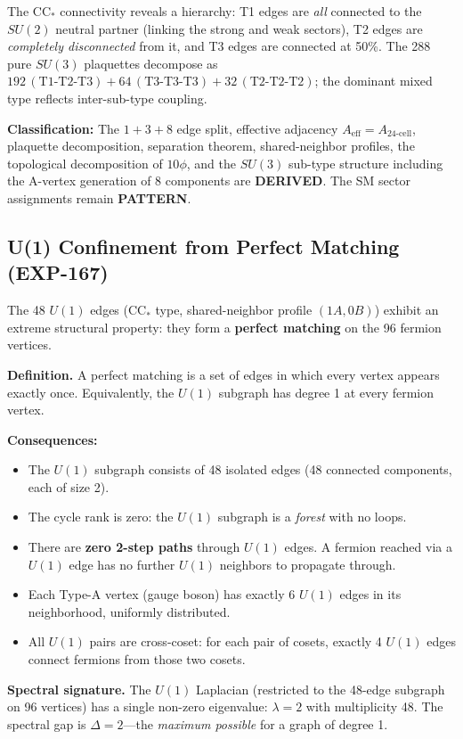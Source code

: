 \documentclass[12pt,a4paper]{article}
\begin{document}
The CC$_*$ connectivity reveals a hierarchy: T1 edges are \emph{all} connected to the $SU(2)$ neutral partner (linking the strong and weak sectors), T2 edges are \emph{completely disconnected} from it, and T3 edges are connected at 50\%. The 288 pure $SU(3)$ plaquettes decompose as $192\,(\text{T1-T2-T3}) + 64\,(\text{T3-T3-T3}) + 32\,(\text{T2-T2-T2})$; the dominant mixed type reflects inter-sub-type coupling.

\textbf{Classification:} The $1 + 3 + 8$ edge split, effective adjacency $A_{\text{eff}} = A_{\text{24-cell}}$, plaquette decomposition, separation theorem, shared-neighbor profiles, the topological decomposition of $10\phi$, and the $SU(3)$ sub-type structure including the A-vertex generation of 8 components are \textbf{DERIVED}. The SM sector assignments remain \textbf{PATTERN}.


\subsection{U(1) Confinement from Perfect Matching (EXP-167)}
\label{sec:u1_confinement}

The 48 $U(1)$ edges (CC$_*$ type, shared-neighbor profile $(1A, 0B)$) exhibit an extreme structural property: they form a \textbf{perfect matching} on the 96 fermion vertices.

\textbf{Definition.} A perfect matching is a set of edges in which every vertex appears exactly once. Equivalently, the $U(1)$ subgraph has degree 1 at every fermion vertex.

\textbf{Consequences:}
\begin{itemize}
    \item The $U(1)$ subgraph consists of 48 isolated edges (48 connected components, each of size 2).
    \item The cycle rank is zero: the $U(1)$ subgraph is a \emph{forest} with no loops.
    \item There are \textbf{zero 2-step paths} through $U(1)$ edges. A fermion reached via a $U(1)$ edge has no further $U(1)$ neighbors to propagate through.
    \item Each Type-A vertex (gauge boson) has exactly 6 $U(1)$ edges in its neighborhood, uniformly distributed.
    \item All $U(1)$ pairs are cross-coset: for each pair of cosets, exactly 4 $U(1)$ edges connect fermions from those two cosets.
\end{itemize}

\textbf{Spectral signature.} The $U(1)$ Laplacian (restricted to the 48-edge subgraph on 96 vertices) has a single non-zero eigenvalue: $\lambda = 2$ with multiplicity 48. The spectral gap is $\Delta = 2$---the \emph{maximum possible} for a graph of degree 1.
\end{document}
